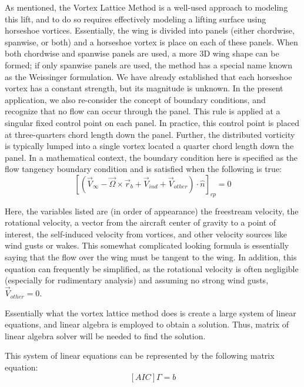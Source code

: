 \documentclass{report}
\begin{document}
\begin{itemize}
As mentioned, the Vortex Lattice Method is a well-used approach to modeling this lift, and to do so requires effectively modeling a lifting surface using horseshoe vortices.
Essentially, the wing is divided into panels (either chordwise, spanwise, or both) and a horseshoe vortex is place on each of these panels. When both chordwise and spanwise panels are used, a more 3D wing shape can be formed; if only spanwise panels are used, the method has a special name known as the Weissinger formulation.
We have already established that each horseshoe vortex has a constant strength, but its magnitude is unknown. In the present application, we also re-consider the concept of boundary conditions, and recognize that no flow can occur through the panel. This rule is applied at a singular fixed control point on each panel.
In practice, this control point is placed at three-quarters chord length down the panel. Further, the distributed vorticity is typically lumped into a single vortex located a quarter chord length down the panel. 
In a mathematical context, the boundary condition here is specified as the flow tangency boundary condition and is satisfied when the following is true:
\begin{equation}\label{boundary_condition}
{\left[\left(\vec{V}_{\infty} - \vec{\Omega} \times \vec{r}_b + \vec{V}_{ind} + \vec{V}_{other}\right) \cdot \hat{n}\right]}_{cp} = 0 
\end{equation}

Here, the variables listed are (in order of appearance) the freestream velocity, the rotational velocity, a vector from the aircraft center of gravity to a point of interest, the self-induced velocity from vortices, and other velocity sources like wind gusts or wakes. This somewhat complicated looking formula is essentially saying that the flow over the wing must be tangent to the wing.
In addition, this equation can frequently be simplified, as the rotational velocity is often negligible (especially for rudimentary analysis) and assuming no strong wind gusts, $\vec{V}_{other} = 0$. 

Essentially what the vortex lattice method does is create a large system of linear equations, and linear algebra is employed to obtain a solution. Thus, matrix of linear algebra solver will be needed to find the solution.

This system of linear equations can be represented by the following matrix equation:
\begin{equation}\label{eq:AIC_matrix}
\left[AIC\right]\Gamma = b
\end{equation}


\end{itemize}
\end{document}
